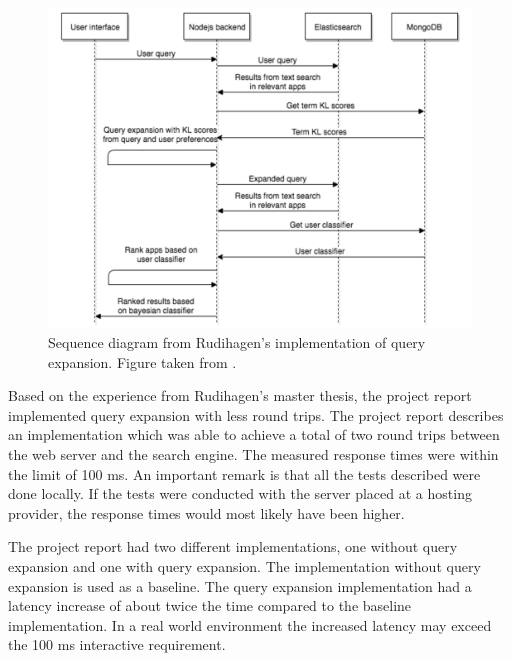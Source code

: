 \begin{figure}[h!]
  \centering \includegraphics[width=1\linewidth]{img/sequence-diagram-rudihagen.png}
  \caption{Sequence diagram from Rudihagen's implementation of query expansion. Figure taken from \cite{master-thesis}.}
  \label{fig:sequence-diagram-rudihagen}
\end{figure}

Based on the experience from Rudihagen's master thesis,
the project report \cite{project-report} implemented query expansion with less round trips.
The project report describes an implementation which was able to achieve a total of two round trips between the web server and the search engine.
The measured response times were within the limit of 100 ms.
An important remark is that all the tests described were done locally.
If the tests were conducted with the server placed at a hosting provider,
the response times would most likely have been higher.

The project report had two different implementations, one without query expansion and one with query expansion.
The implementation without query expansion is used as a baseline.
The query expansion implementation had a latency increase of about twice the time compared to the baseline implementation.
In a real world environment the increased latency may exceed the 100 ms interactive requirement.



